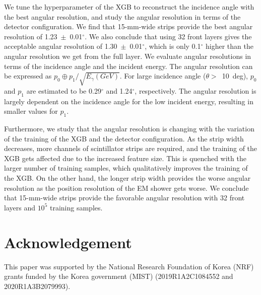 \documentclass[preprint,12pt,times,a4paper]{elsarticle}
\begin{document}
We tune the hyperparameter of the XGB to reconstruct the incidence angle with the best angular resolution, and study the angular resolution in terms of the detector configuration. We find that 15-mm-wide strips provide the best angular resolution of 1.23~$\pm$~0.01$^{\circ}$. We also conclude that using 32 front layers gives the acceptable angular resolution of 1.30~$\pm$~0.01$^{\circ}$, which is only 0.1$^{\circ}$ higher than the angular resolution we get from the full layer. We evaluate angular resolutions in terms of the incidence angle and the incident energy. The angular resolution can be expressed as $p_{0} \oplus p_{1}/\sqrt{E_{\gamma}(GeV)}$. For large incidence angle ($\theta>$~10~deg), $p_{0}$ and $p_{1}$ are estimated to be 0.29$^{\circ}$ and 1.24$^{\circ}$, respectively. The angular resolution is largely dependent on the incidence angle for the low incident energy, resulting in smaller values for $p_{1}$.

Furthermore, we study that the angular resolution is changing with the variation of the training of the XGB and the detector configuration. As the strip width decreases, more channels of scintillator strips are required, and the training of the XGB gets affected due to the increased feature size. This is quenched with the larger number of training samples, which qualitatively improves the training of the XGB. On the other hand, the longer strip width provides the worse angular resolution as the position resolution of the EM shower gets worse. We conclude that 15-mm-wide strips provide the favorable angular resolution with 32 front layers and $10^{5}$ training samples.

\label{sec:con}


\section*{Acknowledgement}
This paper was supported by the National Research Foundation of Korea (NRF) grants funded by the Korea government (MIST) (2019R1A2C1084552 and \\ 2020R1A3B2079993).

\printbibliography
\end{document}
